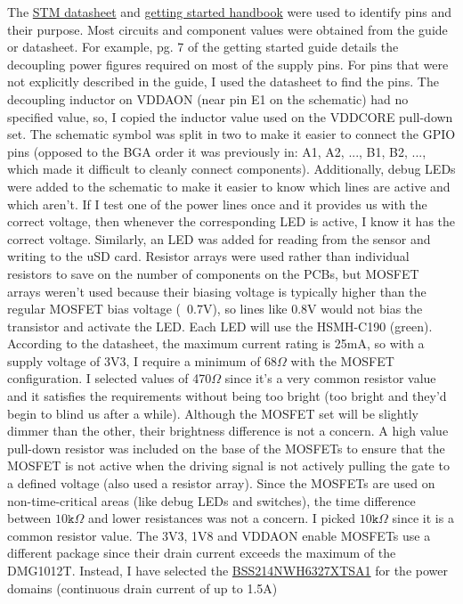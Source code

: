The \href{https://www.st.com/resource/en/datasheet/stm32n657a0.pdf}{STM datasheet} and \href{https://www.st.com/resource/en/application_note/an5967-getting-started-with-hardware-development-for-stm32n6-mcus-stmicroelectronics.pdf}{getting started handbook} were used to identify pins and their purpose. Most circuits and component values were obtained from the guide or datasheet.
For example, pg. 7 of the getting started guide details the decoupling power figures required on most of the supply pins. For pins that were not explicitly described in the guide, I used the datasheet to find the pins. The decoupling inductor on VDDAON (near pin E1 on the schematic) had no specified value, so, I copied the inductor value used on the VDDCORE pull-down set.
The schematic symbol was split in two to make it easier to connect the GPIO pins (opposed to the BGA order it was previously in: A1, A2, ..., B1, B2, ..., which made it difficult to cleanly connect components).
\nl
Additionally, debug LEDs were added to the schematic to make it easier to know which lines are active and which aren't. If I test one of the power lines once and it provides us with the correct voltage, then whenever the corresponding LED is active, I know it has the correct voltage.
Similarly, an LED was added for reading from the sensor and writing to the uSD card. Resistor arrays were used rather than individual resistors to save on the number of components on the PCBs, but MOSFET arrays weren't used because their biasing voltage is typically higher than the regular MOSFET bias voltage (~0.7V), so lines like 0.8V would not bias the transistor and activate the LED.
Each LED will use the HSMH-C190 (green). According to the datasheet, the maximum current rating is 25mA, so with a supply voltage of 3V3, I require a minimum of 68$\Omega$ with the MOSFET configuration. I selected values of 470$\Omega$ since it's a very common resistor value and it satisfies the requirements without being too bright (too bright and they'd begin to blind us after a while).
Although the MOSFET set will be slightly dimmer than the other, their brightness difference is not a concern.
A high value pull-down resistor was included on the base of the MOSFETs to ensure that the MOSFET is not active when the driving signal is not actively pulling the gate to a defined voltage (also used a resistor array). Since the MOSFETs are used on non-time-critical areas (like debug LEDs and switches), the time difference between $10\texttt{k}\Omega$ and lower resistances was not a concern. I picked $10\texttt{k}\Omega$ since it is a common resistor value.
\nl
The 3V3, 1V8 and VDDAON enable MOSFETs use a different package since their drain current exceeds the maximum of the DMG1012T. Instead, I have selected the \href{https://au.mouser.com/ProductDetail/Infineon-Technologies/BSS214NWH6327XTSA1?qs=Dj8dEyEphkMe%252Bfnz0ZE2og%3D%3D}{BSS214NWH6327XTSA1} for the power domains (continuous drain current of up to 1.5A)